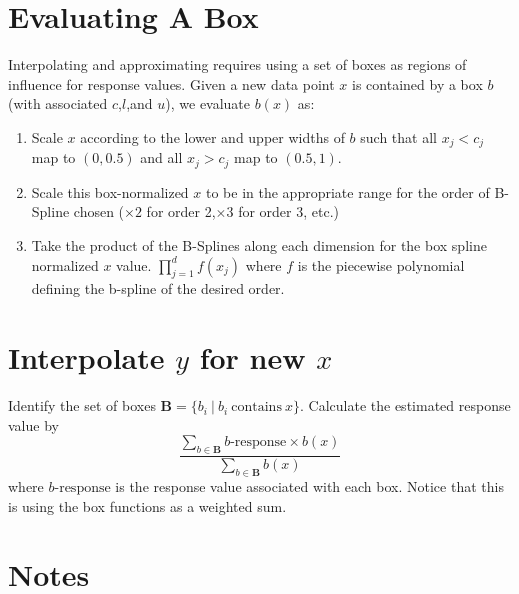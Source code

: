 \documentclass[11pt,margin=1in]{article}
\begin{document}
\begin{algorithm}[H]
\end{algorithm}

\section{Evaluating A Box}
Interpolating and approximating requires using a set of boxes as
regions of influence for response values. Given a new data point $x$
is contained by a box $b$ (with associated $c$,$l$,and $u$), we
evaluate $b(x)$ as:

\begin{enumerate}
\item Scale $x$ according to the lower and upper widths of $b$ such
  that all $x_j < c_j$ map to $(0,0.5)$ and all $x_j > c_j$ map to
  $(0.5,1)$.
\item Scale this box-normalized $x$ to be in the appropriate range for
  the order of B-Spline chosen ($\times 2$ for order 2,$\times 3$ for order 3, etc.)
\item Take the product of the B-Splines along each dimension for the
  box spline normalized $x$ value. $\prod_{j=1}^{d} f(x_j)$ where $f$
  is the piecewise polynomial defining the b-spline of the desired order.

\end{enumerate}

\section{Interpolate $y$ for new $x$}

Identify the set of boxes $\mathbf{B} = \{b_i\ |\ b_i\ \text{contains}\ x\}$.
Calculate the estimated response value by
$$\frac{\sum_{b\in\mathbf{B}}b\text{-response} \times b(x)}{\sum_{b\in\mathbf{B}}b(x)}$$
where $b\text{-response}$ is the response value associated with each
box. Notice that this is using the box functions as a weighted sum.

\section*{Notes}
\end{document}
